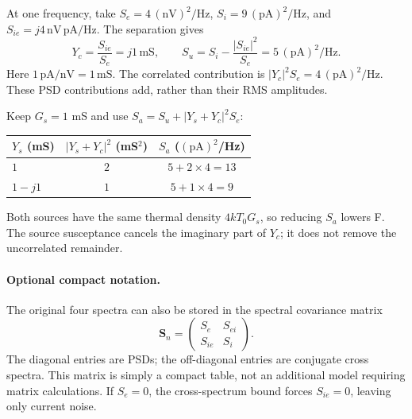 \begin{example}[title={Separating noise and choosing source reactance}]
At one frequency, take $S_e=4\,(\mathrm{nV})^2/\mathrm{Hz}$, $S_i=9\,(\mathrm{pA})^2/\mathrm{Hz}$, and $S_{ie}=j4\,\mathrm{nV\,pA/Hz}$. The separation gives
\[
Y_c=\frac{S_{ie}}{S_e}=j1\,\mathrm{mS},\qquad
S_u=S_i-\frac{|S_{ie}|^2}{S_e}=5\,(\mathrm{pA})^2/\mathrm{Hz}.
\]
Here $1\,\mathrm{pA/nV}=1\,\mathrm{mS}$. The correlated contribution is $|Y_c|^2S_e=4\,(\mathrm{pA})^2/\mathrm{Hz}$. These PSD contributions add, rather than their RMS amplitudes.

Keep $G_s=1$ mS and use $S_a=S_u+|Y_s+Y_c|^2S_e$:
\begin{center}
\begin{tabular}{lcc}\toprule
$Y_s$ (mS) & $|Y_s+Y_c|^2$ (mS$^2$) & $S_a$ ($(\mathrm{pA})^2$/Hz)\\\midrule
$1$ & $2$ & $5+2\times4=13$\\
$1-j1$ & $1$ & $5+1\times4=9$\\\bottomrule
\end{tabular}
\end{center}
Both sources have the same thermal density $4kT_0G_s$, so reducing $S_a$ lowers F. The source susceptance cancels the imaginary part of $Y_c$; it does not remove the uncorrelated remainder.
\end{example}

\AdmittanceCancellationFigure

\paragraph{Optional compact notation.}
The original four spectra can also be stored in the spectral covariance matrix
\[
\bm S_n=\begin{pmatrix}S_e&S_{ei}\\S_{ie}&S_i\end{pmatrix}.
\]
The diagonal entries are PSDs; the off-diagonal entries are conjugate cross spectra. This matrix is simply a compact table, not an additional model requiring matrix calculations. If $S_e=0$, the cross-spectrum bound forces $S_{ie}=0$, leaving only current noise.

